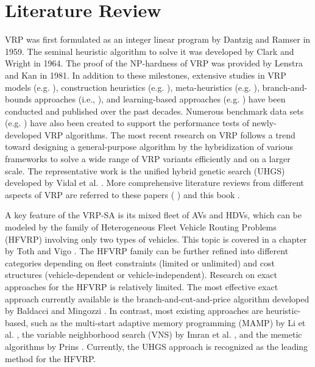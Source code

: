 \section{Literature Review}
\label{sec:literature}
VRP was first formulated as an integer linear program by Dantzig and Ramser \cite{dantzig1959truck} in 1959. The seminal heuristic algorithm to solve it was developed by Clark and Wright \cite{clarke1964scheduling} in 1964. The proof of the NP-hardness of VRP was provided by Lenstra and Kan \cite{lenstra1981complexity} in 1981. In addition to these milestones, extensive studies in VRP models (e.g. \cite{golden1984fleet}
\cite{kolen1987vehicle} \cite{savelsbergh1995general}
\cite{renaud1996tabu} \cite{erdougan2012green}
\cite{schneider2014electric}), construction heuristics (e.g. \cite{gillett1974heuristic} \cite{fisher1981generalized} \cite{bramel1995location}), meta-heuristics (e.g. \cite{homberger1999two} \cite{bell2004ant} \cite{pisinger2007general}), branch-and-bounds approaches (i.e., \cite{desrochers1992new} \cite{fischetti1994branch} \cite{fukasawa2006robust}), and learning-based approaches (e.g. \cite{nazari2018reinforcement} \cite{kool2018attention} \cite{li2021learning}) have been conducted and published over the past decades. Numerous benchmark data sets (e.g. \cite{solomon1987algorithms} \cite{augerat1995computational} \cite{uchoa2017new}) have also been created to support the performance tests of newly-developed VRP algorithms. The most recent research on VRP follows a trend toward designing a general-purpose algorithm by the hybridization of various frameworks to solve a wide range of VRP variants efficiently and on a larger scale. The representative work is the unified hybrid genetic search (UHGS) developed by Vidal et al. \cite{VIDAL2014658}. More comprehensive literature reviews from different aspects of VRP are referred to these papers (\cite{braysy2005vehicle_1} \cite{braysy2005vehicle_2} \cite{montoya2015literature} \cite{kocc2016thirty} \cite{lin2014survey} \cite{braekers2016vehicle}) and this book \cite{toth2014vehicle}.

A key feature of the VRP-SA is its mixed fleet of AVs and HDVs, which can be modeled by the family of Heterogeneous Fleet Vehicle Routing Problems (HFVRP) involving only two types of vehicles. This topic is covered in a chapter by Toth and Vigo \cite{toth2014vehicle}. The HFVRP family can be further refined into different categories depending on fleet constraints (limited or unlimited) and cost structures (vehicle-dependent or vehicle-independent). Research on exact approaches for the HFVRP is relatively limited. The most effective exact approach currently available is the branch-and-cut-and-price algorithm developed by Baldacci and Mingozzi \cite{baldacci2009unified}. In contrast, most existing approaches are heuristic-based, such as the multi-start adaptive memory programming (MAMP) by Li et al. \cite{LI20101111}, the variable neighborhood search (VNS) by Imran et al. \cite{IMRAN2009509}, and the memetic algorithms by Prins \cite{PRINS2009916}. Currently, the UHGS approach \cite{VIDAL2014658} is recognized as the leading method for the HFVRP.

